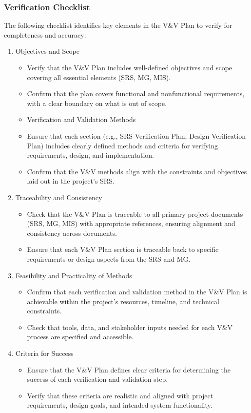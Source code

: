 \documentclass[12pt, titlepage]{article}
\begin{document}
\subsubsection{Verification Checklist}
The following checklist identifies key elements in the V\&V Plan to verify for completeness and accuracy:
\begin{enumerate}
  \item Objectives and Scope
    \begin{itemize}
      \item Verify that the V\&V Plan includes well-defined objectives and scope covering all essential elements (SRS, MG, MIS).
      \item Confirm that the plan covers functional and nonfunctional requirements, with a clear boundary on what is out of scope.
      \item Verification and Validation Methods
      \item Ensure that each section (e.g., SRS Verification Plan, Design Verification Plan) includes clearly defined methods and criteria for verifying requirements, design, and implementation.
      \item Confirm that the V\&V methods align with the constraints and objectives laid out in the project’s SRS.
    \end{itemize}
  \item Traceability and Consistency
    \begin{itemize}
      \item Check that the V\&V Plan is traceable to all primary project documents (SRS, MG, MIS) with appropriate references, ensuring alignment and consistency across documents.
      \item Ensure that each V\&V Plan section is traceable back to specific requirements or design aspects from the SRS and MG.
    \end{itemize}
  \item Feasibility and Practicality of Methods
    \begin{itemize}
      \item Confirm that each verification and validation method in the V\&V Plan is achievable within the project’s resources, timeline, and technical constraints.
      \item Check that tools, data, and stakeholder inputs needed for each V\&V process are specified and accessible.
    \end{itemize}
  \item Criteria for Success
    \begin{itemize}
      \item Ensure that the V\&V Plan defines clear criteria for determining the success of each verification and validation step.
      \item Verify that these criteria are realistic and aligned with project requirements, design goals, and intended system functionality.
    \end{itemize}
\end{enumerate}
\end{document}
